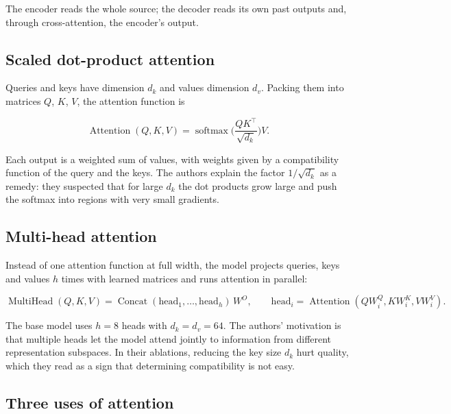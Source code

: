 The encoder reads the whole source; the decoder reads its own past
outputs and, through cross-attention, the encoder's output.

\subsection{Scaled dot-product
attention}\label{sec:math:II2}

Queries and keys have dimension \(d_k\) and values dimension \(d_v\). Packing
them into matrices \(Q\), \(K\), \(V\), the attention function is

\[
\operatorname{Attention}(Q, K, V) = \operatorname{softmax}\!\Big(\frac{Q K^\top}{\sqrt{d_k}}\Big) V.
\]

Each output is a weighted sum of values, with weights given by a
compatibility function of the query and the keys. The authors explain
the factor \(1/\sqrt{d_k}\) as a remedy: they suspected that for large \(d_k\) the
dot products grow large and push the softmax into regions with very
small gradients.

\subsection{Multi-head attention}\label{sec:math:II3}

Instead of one attention function at full width, the model projects
queries, keys and values \(h\) times with learned matrices and runs
attention in parallel:

\[
\operatorname{MultiHead}(Q, K, V) = \operatorname{Concat}(\mathrm{head}_1, \dots, \mathrm{head}_h)\, W^O, \qquad \mathrm{head}_i = \operatorname{Attention}(Q W_i^Q, K W_i^K, V W_i^V).
\]

The base model uses \(h = 8\) heads with \(d_k = d_v = 64\). The authors'
motivation is that multiple heads let the model attend jointly to
information from different representation subspaces. In their ablations,
reducing the key size \(d_k\) hurt quality, which they read as a sign that
determining compatibility is not easy.

\subsection{Three uses of
attention}\label{sec:math:II4}


